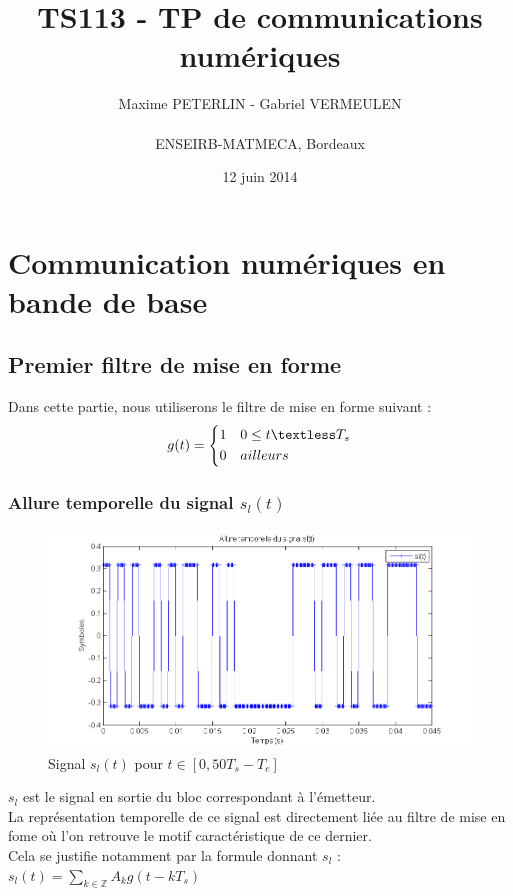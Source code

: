 \documentclass[11pt]{article}
\title{\textbf{TS113 - TP de communications numériques}}
\author{Maxime PETERLIN - Gabriel VERMEULEN\\\\{ENSEIRB-MATMECA, Bordeaux}}
\date{12 juin 2014}
\begin{document}
\maketitle
\tableofcontents

\newpage

\section{Communication numériques en bande de base}
	
	\subsection{Premier filtre de mise en forme}
		Dans cette partie, nous utiliserons le filtre de mise en forme suivant :
		\begin{equation}
			g(t) = 
			\left\{
		    	\begin{aligned}
		    		1&\,\,\,\,\,\, 0 \le t \textless T_s\\
		    		0&\,\,\,\,\,\, ailleurs
		      	\end{aligned}
		    \right.
		\end{equation}
		
		\subsubsection{Allure temporelle du signal $s_l(t)$}
			\begin{figure}[h]
				\centering
				\includegraphics[scale=0.5]{images/Q311.png}
				\caption{Signal $s_l(t)$ pour $t \in [0, 50T_s-T_e]$}
				\label{Q311}
			\end{figure}
			$s_l$ est le signal en sortie du bloc correspondant à l'émetteur. \\
			La représentation temporelle de ce signal est directement liée au filtre de mise en fome où l'on retrouve le motif caractéristique de ce dernier.\\
			Cela se justifie notamment par la formule donnant $s_l$ : $s_l(t) = \sum\limits_{k \in \mathbb{Z}} A_kg(t-kT_s)$
			
\end{document}
